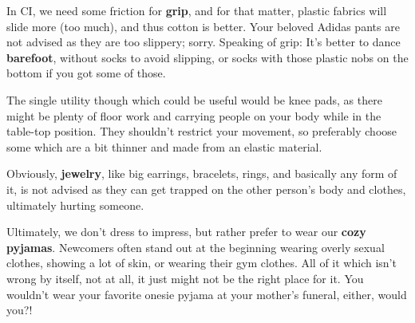 In CI, we need some friction for \textbf{grip}, and for that matter, plastic fabrics will slide more (too much), and thus cotton is better.
Your beloved Adidas pants are not advised as they are too slippery; sorry.
Speaking of grip: It's better to dance \textbf{barefoot}, without socks to avoid slipping, or socks with those plastic nobs on the bottom if you got some of those.

The single utility though which could be useful would be knee pads, as there might be plenty of floor work and carrying people on your body while in the table-top position.
They shouldn't restrict your movement, so preferably choose some which are a bit thinner and made from an elastic material.

Obviously, \textbf{jewelry}, like big earrings, bracelets, rings, and basically any form of it, is not advised as they can get trapped on the other person's body and clothes, ultimately hurting someone.

Ultimately, we don't dress to impress, but rather prefer to wear our \textbf{cozy pyjamas}.
Newcomers often stand out at the beginning wearing overly sexual clothes, showing a lot of skin, or wearing their gym clothes.
All of it which isn't wrong by itself, not at all, it just might not be the right place for it.
You wouldn't wear your favorite onesie pyjama at your mother's funeral, either, would you?!
